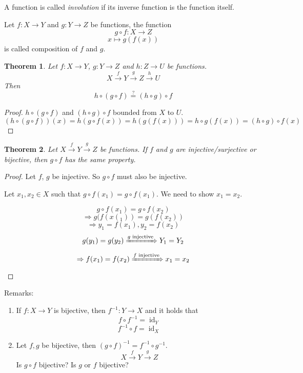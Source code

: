 \documentclass[a4paper,landscape,twocolumn]{article}
\newtheorem{theorem}{Theorem}
\begin{document}
A function is called \emph{involution} if its inverse function is the function itself.

Let $f: X \rightarrow Y$ and $g: Y \rightarrow Z$ be functions, the function
\[ g \circ f: X \rightarrow Z\]
\[ x \mapsto g(f(x)) \]
is called composition of $f$ and $g$.

\begin{theorem}
Let $f: X\rightarrow Y$, $g: Y\rightarrow Z$ and $h: Z \rightarrow U$ be functions.
\[ X \xrightarrow{f} Y \xrightarrow{g} Z \xrightarrow{h} U \]
Then
\[ h\circ(g\circ f) \overset{?}{=} (h\circ g)\circ f \]
\end{theorem}

\begin{proof}
$h\circ (g\circ f)$ and $(h\circ g) \circ f$ bounded from $X$ to $U$.
\[
    (h\circ (g\circ f))(x) =
    h(g\circ f(x)) =
    h(g(f(x))) =
    h\circ g(f(x)) =
    (h\circ g)\circ f(x)
\]
\end{proof}

\begin{theorem}
  Let $X \xrightarrow{f} Y \xrightarrow{g} Z$ be functions.
  If $f$ and $g$ are injective/surjective or bijective,
  then $g\circ f$ has the same property.
\end{theorem}

\begin{proof}
  Let $f$, $g$ be injective. So $g\circ f$ must also be injective.

  Let $x_1,x_2 \in X$ such that $g\circ f(x_1) = g\circ f(x_1)$.
  We need to show $x_1 = x_2$.

  \[ g\circ f(x_1) = g\circ f(x_2) \]
  \[ \Rightarrow g(f(x(_1)) = g(f(x_2)) \]
  \[ \Rightarrow y_1 = f(x_1), y_2 = f(x_2) \]
  \[ g(y_1) = g(y_2) \xRightarrow{g \text{ injective}} Y_1 = Y_2 \]
  \[ \Rightarrow f(x_1) = f(x_2) \xRightarrow{f \text{ injective}} x_1 = x_2 \]
\end{proof}

Remarks:
\begin{enumerate}
  \item
    If $f: X \rightarrow Y$  is bijective, then $f^{-1}: Y \rightarrow X$ and it holds that
    \[ f\circ f^{-1} = \operatorname{id}_Y \]
    \[ f^{-1}\circ f = \operatorname{id}_X \]

  \item
    Let $f,g$ be bijective, then $(g\circ f)^{-1} = f^{-1} \circ g^{-1}$.
    \[ X \xrightarrow{f} Y \xrightarrow{g} Z \]
    Is $g\circ f$ bijective? Is $g$ or $f$ bijective?
\end{enumerate}
\end{document}
